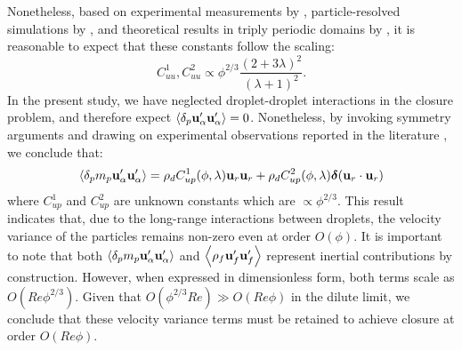 Nonetheless, based on experimental measurements by \citet{cartellier2009induced}, particle-resolved simulations by \citet{fintzi2025}, and theoretical results in triply periodic domains by \citet{hill2001first}, it is reasonable to expect that these constants follow the scaling:
\begin{equation}
C_{uu}^1, C_{uu}^2 \propto \phi^{2/3} \frac{(2+3\lambda)^2}{(\lambda+1)^2}.
\end{equation}
In the present study, we have neglected droplet-droplet interactions in the closure problem, and therefore expect $\left<\delta_{p} \textbf{u}_\alpha'\textbf{u}_\alpha'\right> = 0$. 
Nonetheless, by invoking symmetry arguments and drawing on experimental observations reported in the literature \citep{guazzelli2011fluctuations}, we conclude that:
\begin{equation}
    \pavg{m_p \textbf{u}_\alpha'\textbf{u}_\alpha'}
    =
    \rho_d C^1_{up}(\phi,\lambda)\textbf{u}_r\textbf{u}_r
    + \rho_d C^2_{up}(\phi,\lambda) \bm\delta(\textbf{u}_r\cdot \textbf{u}_r)
    \label{eq:upup}
\end{equation}
where $C_{up}^1$ and $C_{up}^2$ are unknown constants which are $\propto \phi^{2/3}$\citep{guazzelli2011fluctuations}. 
This result indicates that, due to the long-range interactions between droplets, the velocity variance of the particles remains non-zero even at order $O(\phi)$.
It is important to note that both $\left<\delta_{p} m_p \textbf{u}_\alpha'\textbf{u}_\alpha'\right>$ and $\left<\rho_f \textbf{u}_f'\textbf{u}_f'\right>$ represent inertial contributions by construction.
However, when expressed in dimensionless form, both terms scale as $O(Re  \phi^{2/3})$.
Given that $O(\phi^{2/3}Re) \gg O(Re\phi)$ in the dilute limit, we conclude that these velocity variance terms must be retained to achieve closure at order $O(Re\phi)$.


